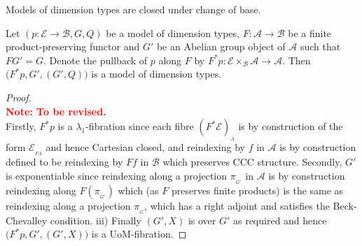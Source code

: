\documentclass[a4paper,UKenglish]{lipics}
\newcommand\note[1]{{ \bf \textcolor{red} {\vspace{2mm}\; \\ Note: #1\\}}}
\newcommand{\LamOneFib}{$\lambda_1$-fibration\xspace}
\newcommand{\ra}{\rightarrow}
\newcommand{\A}{\mathcal{A}}
\newcommand{\B}{\mathcal{B}}
\newcommand{\E}{\mathcal{E}}
\newcommand{\fibre}[2]{#1_{_{#2}}}
\newcommand{\fibreE}[1]{\E_{_{#1}}}
\newcommand{\blank}{\, \underline{\hspace{2mm}} \,}
\newcommand{\bbracket}[1]{\bigl( #1 \bigr)}
\begin{document}
%

Models of dimension types are closed under change of base.
\begin{theorem}
  Let $(p: \E \ra \B, G, Q)$ be a model of dimension types, $F:\A \ra
  \B$ be a finite product-preserving functor and $G'$ be an Abelian
  group object of $\A$ such that $FG' = G$.  Denote the pullback of
  $p$ along $F$ by $F^\ast p : \E\times_\B\A \rightarrow \A$. Then
  $\bbracket{F^{\ast}p, G', (G',Q)}$ is a model of dimension types.
\end{theorem}

\begin{proof}\note{To be revised.}
Firstly, $F^*p$ is a \LamOneFib since each fibre $\fibre{(F^*\E)}{A}$ is by construction of the form $\fibreE{FA}$ and hence Cartesian closed, and  reindexing by $f$ in $\A$ is by construction defined to be reindexing by $Ff$ in $\B$ which preserves CCC structure. Secondly, $G'$ is exponentiable since reindexing along a projection $\pi_{_{G'}}$ in $\A$ is by construction reindexing along $F(\pi_{_{G'}})$ which (as $F$ preserves finite products) is the same as reindexing along a projection $\pi_{_{G}}$, which has a right adjoint and satisfies the Beck-Chevalley condition. iii) Finally $(G', X)$ is over $G'$ as required and hence $\bbracket{F^{\ast}p, G', (G',X)}$ is a UoM-fibration.
\end{proof}
\end{document}

